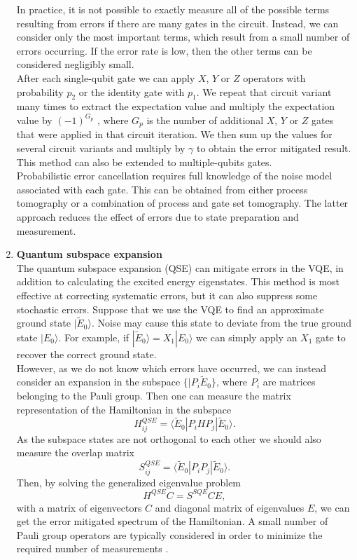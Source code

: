 \begin{enumerate}
    In practice, it is not possible to exactly measure all of the possible terms resulting from errors if there are many gates in the circuit. Instead, we can consider only the most important terms, which result from a small number of errors occurring. If the error rate is low, then the other terms can be considered negligibly small. \\
    After each single-qubit gate we can apply $X$, $Y$ or $Z$ operators with probability $p_2$ or the identity gate with $p_1$. We repeat that circuit variant many times to extract the expectation value and multiply the expectation value by $(-1)^{G_p}$ , where $G_p$ is the number of additional $X$, $Y$ or $Z$ gates that were applied in that circuit iteration. We then sum up the values for several circuit variants and multiply by $\gamma$ to obtain the error mitigated result. This method can also be extended to multiple-qubits gates. \\
    Probabilistic error cancellation requires full knowledge of the noise model associated with each gate. This can be obtained from either process tomography or a combination of process and gate set tomography. The latter approach reduces the effect of errors due to state preparation and measurement.
    
    \item \textbf{Quantum subspace expansion} \\
    The quantum subspace expansion (QSE) can mitigate errors in the VQE, in addition to calculating the excited energy eigenstates. This method is most effective at correcting systematic errors, but it can also suppress some stochastic errors. Suppose that we use the VQE to find an approximate ground state $|\tilde{E}_0\rangle$. Noise may cause this state to deviate from the true ground state $|E_0\rangle$. For example, if $|\tilde{E}_0\rangle = X_1|E_0\rangle$ we can simply apply an $X_1$ gate to recover the correct ground state. \\
    However, as we do not know which errors have occurred, we can instead consider an expansion in the subspace $\{ |P_i \tilde{E}_0 \}$, where $P_i$ are matrices belonging to the Pauli group. Then one can measure the matrix representation of the Hamiltonian in the subspace
    \begin{equation}
        H^{QSE}_{ij} = \langle\tilde{E}_0|P_iHP_j|\tilde{E}_0\rangle.
    \end{equation}
    As the subspace states are not orthogonal to each other we should also measure the overlap matrix
    \begin{equation}
        S^{QSE}_{ij} = \langle\tilde{E}_0|P_iP_j|\tilde{E}_0\rangle.
    \end{equation}
    Then, by solving the generalized eigenvalue problem
    \begin{equation}
        H^{QSE} C = S^{SQE} C E,
    \end{equation}
    with a matrix of eigenvectors $C$ and diagonal matrix of eigenvalues $E$, we can get the error mitigated spectrum of the Hamiltonian. A small number of Pauli group operators are typically considered in order to minimize the required number of measurements \cite{McArdle2020Mar}.
\end{enumerate}


